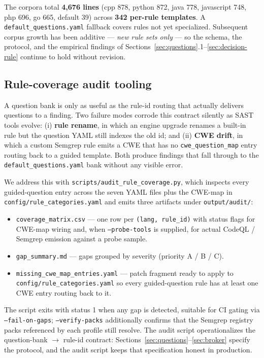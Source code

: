 \documentclass[11pt,a4paper]{article}
\begin{document}
The corpora total \textbf{4{,}676 lines} (cpp 878, python 872, java
778, javascript 748, php 696, go 665, default 39) across
\textbf{342 per-rule templates}. A \texttt{default\_questions.yaml}
fallback covers rules not yet specialized. Subsequent corpus growth has
been additive --- \emph{new rule sets only} --- so the schema, the
protocol, and the empirical findings of
Sections~\ref{sec:questions}.1--\ref{sec:decision-rule} continue to
hold without revision.

\subsection{Rule-coverage audit tooling}
\label{sec:audit}

A question bank is only as useful as the rule-id routing that actually
delivers questions to a finding. Two failure modes corrode this
contract silently as SAST tools evolve: (i) \textbf{rule rename}, in
which an engine upgrade renames a built-in rule but the question YAML
still indexes the old id; and (ii) \textbf{CWE drift}, in which a
custom Semgrep rule emits a CWE that has no \texttt{cwe\_question\_map}
entry routing back to a guided template. Both produce findings that
fall through to the \texttt{default\_questions.yaml} bank without any
visible error.

We address this with \texttt{scripts/audit\_rule\_coverage.py}, which
inspects every guided-question entry across the seven YAML files plus
the CWE-map in \texttt{config/rule\_categories.yaml} and emits three
artifacts under \texttt{output/audit/}:

\begin{itemize}[leftmargin=*]
\item \texttt{coverage\_matrix.csv} --- one row per
  \texttt{(lang, rule\_id)} with status flags for CWE-map wiring and,
  when \texttt{--probe-tools} is supplied, for actual CodeQL / Semgrep
  emission against a probe sample.
\item \texttt{gap\_summary.md} --- gaps grouped by severity
  (priority A / B / C).
\item \texttt{missing\_cwe\_map\_entries.yaml} --- patch fragment ready
  to apply to \texttt{config/rule\_categories.yaml} so every
  guided-question rule has at least one CWE entry routing back to it.
\end{itemize}

The script exits with status 1 when any gap is detected, suitable for
CI gating via \texttt{--fail-on-gaps}; \texttt{--verify-packs}
additionally confirms that the Semgrep registry packs referenced by
each profile still resolve. The audit script operationalizes the
question-bank $\rightarrow$ rule-id contract:
Sections~\ref{sec:questions}--\ref{sec:broker} specify the protocol,
and the audit script keeps that specification honest in production.
\end{document}
